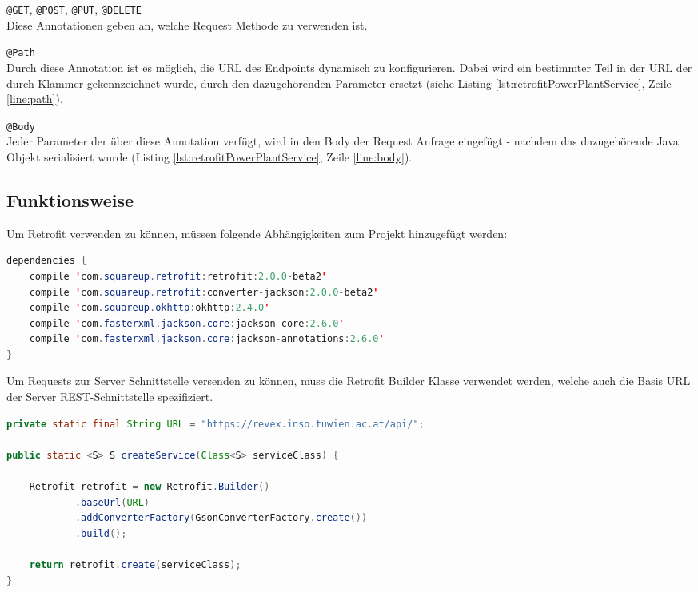 \begin{list}{-}{}
	\item \texttt{@GET}, \texttt{@POST}, \texttt{@PUT}, \texttt{@DELETE}\\
	Diese Annotationen geben an, welche Request Methode zu verwenden ist.
	\item \texttt{@Path} \\
	Durch diese Annotation ist es möglich, die URL des Endpoints dynamisch zu konfigurieren. Dabei wird ein bestimmter Teil in der URL der durch Klammer gekennzeichnet wurde, durch den dazugehörenden Parameter ersetzt (siehe Listing \ref{lst:retrofitPowerPlantService}, Zeile \ref{line:path}).
	\item \texttt{@Body} \\
	Jeder Parameter der über diese Annotation verfügt, wird in den Body der Request Anfrage eingefügt - nachdem das dazugehörende Java Objekt serialisiert wurde (Listing \ref{lst:retrofitPowerPlantService}, Zeile \ref{line:body}).
\end{list}

\subsection{Funktionsweise}
Um Retrofit verwenden zu können, müssen folgende Abhängigkeiten zum Projekt hinzugefügt werden:

\begin{lstlisting}[language=java, label=dependenciesRetrofit, numbers=none, frame=single]
dependencies {
	compile 'com.squareup.retrofit:retrofit:2.0.0-beta2'
	compile 'com.squareup.retrofit:converter-jackson:2.0.0-beta2'
	compile 'com.squareup.okhttp:okhttp:2.4.0'
	compile 'com.fasterxml.jackson.core:jackson-core:2.6.0'
	compile 'com.fasterxml.jackson.core:jackson-annotations:2.6.0'
}
\end{lstlisting}

Um Requests zur Server Schnittstelle versenden zu können, muss die Retrofit Builder Klasse verwendet werden, welche auch die Basis URL der Server REST-Schnittstelle spezifiziert.

\begin{lstlisting}[language=java, caption={Retrofit Builder},label=retrofitBuilder, frame=single, stringstyle=\color{mymauve}\scriptsize]
private static final String URL = "https://revex.inso.tuwien.ac.at/api/";
 
public static <S> S createService(Class<S> serviceClass) {

	Retrofit retrofit = new Retrofit.Builder()
			.baseUrl(URL)
			.addConverterFactory(GsonConverterFactory.create())
			.build();
	
	return retrofit.create(serviceClass);
}
\end{lstlisting}

